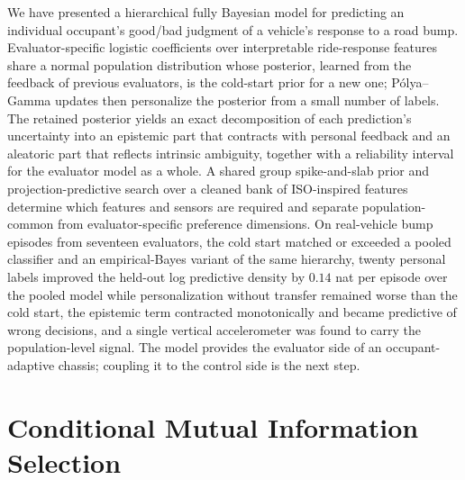 \documentclass[lettersize,journal]{IEEEtran}
\begin{document}
We have presented a hierarchical fully Bayesian model for predicting an individual occupant's good/bad judgment of a vehicle's response to a road bump. Evaluator-specific logistic coefficients over interpretable ride-response features share a normal population distribution whose posterior, learned from the feedback of previous evaluators, is the cold-start prior for a new one; P\'{o}lya--Gamma updates then personalize the posterior from a small number of labels. The retained posterior yields an exact decomposition of each prediction's uncertainty into an epistemic part that contracts with personal feedback and an aleatoric part that reflects intrinsic ambiguity, together with a reliability interval for the evaluator model as a whole. A shared group spike-and-slab prior and projection-predictive search over a cleaned bank of ISO-inspired features determine which features and sensors are required and separate population-common from evaluator-specific preference dimensions. On real-vehicle bump episodes from seventeen evaluators, the cold start matched or exceeded a pooled classifier and an empirical-Bayes variant of the same hierarchy, twenty personal labels improved the held-out log predictive density by $0.14$ nat per episode over the pooled model while personalization without transfer remained worse than the cold start, the epistemic term contracted monotonically and became predictive of wrong decisions, and a single vertical accelerometer was found to carry the population-level signal. The model provides the evaluator side of an occupant-adaptive chassis; coupling it to the control side is the next step.

\appendices

\section{Conditional Mutual Information Selection}
\label{app:cmi}
\end{document}
